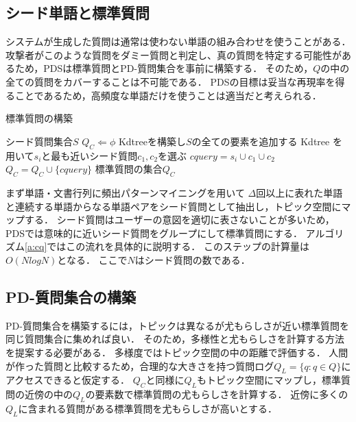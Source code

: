 \documentclass[master]{suribt}
\theoremstyle{definition}
\begin{document}
 \subsection{シード単語と標準質問}
 システムが生成した質問は通常は使わない単語の組み合わせを使うことがある．
 攻撃者がこのような質問をダミー質問と判定し、真の質問を特定する可能性があるため，PDSは標準質問とPD-質問集合を事前に構築する．
 そのため，$Q$の中の全ての質問をカバーすることは不可能である．
 PDSの目標は妥当な再現率を得ることであるため，高頻度な単語だけを使うことは適当だと考えられる．
 
 \begin{algorithm}
 \caption{標準質問の構築}
 \begin{algorithmic}[1]
  \Require シード質問集合$S$
  \State $Q_C \Leftarrow \phi$
  \State Kdtreeを構築し$S$の全ての要素を追加する
  \State Kdtree を用いて$s_i$と最も近いシード質問$c_1,c_2$を選ぶ
  \State $cquery = s_i \cup c_1 \cup c_2$
  \State $Q_C = Q_C \cup \{cquery\}$
  \EndIf
  \EndFor
  \Ensure 標準質問の集合$Q_C$
 \end{algorithmic}
 \label{a:cq}
 \end{algorithm}

 まず単語・文書行列に頻出パターンマイニング\cite{apriori2010}を用いて
 $\Delta$回以上に表れた単語と連続する単語からなる単語ペアをシード質問として抽出し，トピック空間にマップする．
 シード質問はユーザーの意図を適切に表さないことが多いため，
 PDSでは意味的に近いシード質問をグループにして標準質問にする．
 アルゴリズム\ref{a:cq}ではこの流れを具体的に説明する．
 このステップの計算量は$O(NlogN)$となる．
 ここで$N$はシード質問の数である．

 \subsection{PD-質問集合の構築}
 PD-質問集合を構築するには，トピックは異なるが尤もらしさが近い標準質問を同じ質問集合に集めれば良い．
 そのため，多様性と尤もらしさを計算する方法を提案する必要がある．
 多様度ではトピック空間の中の距離で評価する．
 人間が作った質問と比較するため，合理的な大きさを持つ質問ログ$Q_L = \{q: q \in Q\}$にアクセスできると仮定する．
 $Q_C$と同様に$Q_L$もトピック空間にマップし，標準質問の近傍の中の$Q_L$の要素数で標準質問の尤もらしさを計算する．
 近傍に多くの$Q_L$に含まれる質問がある標準質問を尤もらしさが高いとする．
\end{document}
